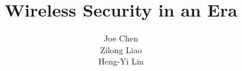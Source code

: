 \documentclass[letterpaper]{sig-alternate-05-2015}
\begin{document}

\title{Wireless Security in an  Era}

\author{
\alignauthor
Joe Chen\\
 \alignauthor
Zilong Liao\\
\alignauthor
Heng-Yi Lin\\
}

\maketitle
%






\nocite{*} 


\end{document}
